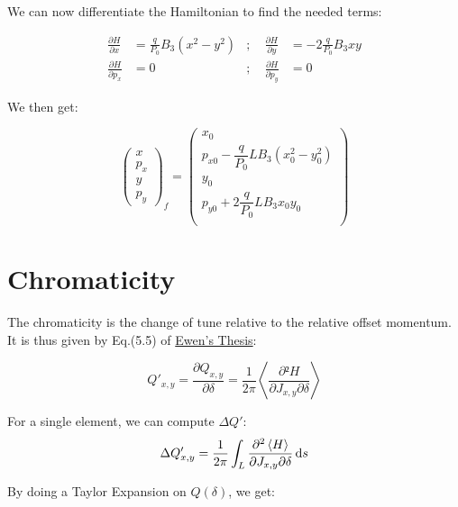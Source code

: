 \documentclass[openright,twoside,headsepline,bibliography=totoc]{scrbook}
\begin{document}
We can now differentiate the Hamiltonian to find the needed terms:

\begin{equation}
\begin{aligned}
\frac{\partial H}{\partial x} &= \frac{q}{P_0} B_3 (x^2 - y^2) &; \quad \frac{\partial H}{\partial y} &= -2 \frac{q}{P_0} B_3 x y \\
\frac{\partial H}{\partial p_x} &= 0                 &; \quad \frac{\partial H}{\partial p_y} &= 0
\end{aligned}
\end{equation}

We then get:

\begin{equation}
\begin{pmatrix}
x \\ p_x \\ y \\ p_y
\end{pmatrix}_f
=
\begin{pmatrix}
x_0 \\
p_{x0} - \dfrac{q}{P_0} L B_3 (x_0^2 - y_0^2) \\
y_0 \\
p_{y0} + 2\dfrac{q}{P_0} L B_3 x_0 y_0 \\
\end{pmatrix}
\end{equation}

\newpage

\hypertarget{chromaticity}{%
\section{Chromaticity}\label{chromaticity}}

The chromaticity is the change of tune relative to the relative offset
momentum. It is thus given by Eq.(5.5) of
\href{https://cds.cern.ch/record/1951379/files/Thesis-2014-Ewen}{Ewen's
Thesis}:

\[Q'_{x,y} = \frac{\partial Q_{x,y}}{\partial \delta} = \frac{1}{2\pi}\left< \frac{\partial² H}{\partial J_{x,y}\partial \delta}\right>\]

For a single element, we can compute $\Delta Q'$:
\begin{equation}\Delta Q_{x,y}' = \frac{1}{2\pi} \int_L \frac{\partial^2 \left< H \right>}{\partial J_{x,y} \partial \delta} \mathop{}\!\mathrm{d} s\label{eq:chroma}\end{equation}

By doing a Taylor Expansion on \(Q(\delta)\), we get:
\end{document}
